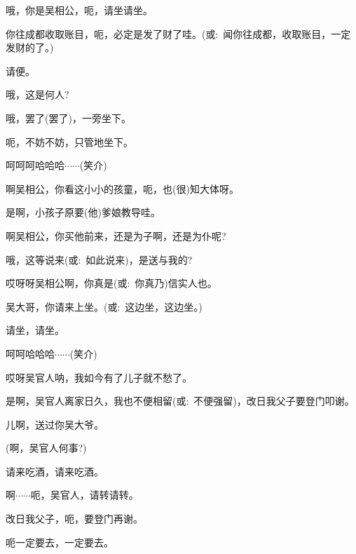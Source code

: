 {{

{\vspace{5pt}}


{哦，你是吴相公，呃，请坐请坐。}

{你往成都收取账目，呃，必定是发了财了哇。(或:~}闻你往成都，收取账目，一定发财的了。{)}

{请便。}

{哦，这是何人?}

{哦，罢了(罢了)，一旁坐下。}

{呃，不妨不妨，只管地坐下。}

{呵呵呵哈哈哈$\cdots{}\cdots{}$({\hwfs 笑}{\hwfs 介})}

{啊吴相公，你看这小小的孩童，呃，也(很)知大体呀。}

{是啊，小孩子原要(他)爹娘教导哇。}

{啊吴相公，你买他前来，还是为子啊，还是为仆呢?}

{哦，这等说来(或:~}如此说来){，是送与我的?}

{哎呀呀吴相公啊，你真是(或:~}你真乃){信实人也。}


{吴大哥，你请来上坐。(或:~}这边坐，这边坐。{)}

{请坐，请坐。}


{呵呵哈哈哈$\cdots{}\cdots{}$({\hwfs 笑}{\hwfs 介})}

{哎呀吴官人呐，我如今有了儿子就不愁了。}

{是啊，吴官人离家日久，我也不便相留(或:~}不便强留{)，改日我父子要登门叩谢。}

{儿啊，送过你吴大爷。}

{(啊，吴官人何事?)}

{请来吃酒，请来吃酒。}

{啊$\cdots{}\cdots{}$呃，吴官人，请转请转。}

{改日我父子，呃，要登门再谢。}

{呃一定要去，一定要去。}

}}

